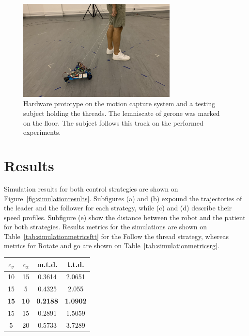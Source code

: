 \documentclass[journal]{IEEEtran}
\begin{document}
\begin{figure}[h!]
\centering
\includegraphics[width=8cm]{images/capture.png}
\caption{Hardware prototype on the motion capture system and a testing subject holding the threads.  The lemniscate of gerone was marked on the floor.  The subject follows this track on the performed experiments.}
\label{fig:capturesystem}
\end{figure}



\section{Results} \label{Results}
\label{results}

Simulation results for both control strategies are shown on Figure~\ref{fig:simulationresults}. Subfigures (a) and (b) expound the trajectories of the leader and the follower for each strategy, while (c) and (d) describe their speed profiles.  Subfigure (e) show the distance between the robot and the patient for both strategies.  Results metrics for the simulations are shown on Table~\ref{tab:simulationmetricsftt} for the Follow the thread strategy, whereas metrics for Rotate and go are shown on Table~\ref{tab:simulationmetricsrg}.


\begin{center}
\begin{tabular}{ |c|c|c|c| }
\hline
$c_v$ & $c_{\alpha}$ & m.t.d. & t.t.d. \\
\hline
10  &   15  & 0.3614 & 2.0651\\
15  &   5  & 0.4325 & 2.055\\
\textbf{15}  &   \textbf{10}  & \textbf{0.2188} & \textbf{1.0902}\\
15  &   15  & 0.2891 & 1.5059\\
5  &   20  & 0.5733 & 3.7289\\
\hline
\end{tabular}
\label{tab:simulationmetricsftt}
\end{center}
\end{document}
